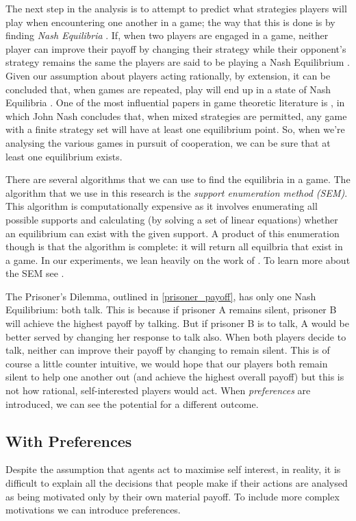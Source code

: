 \documentclass[11pt]{book}
\newcommand*{\np}{\par\noindent\newline}
\begin{document}
\np The next step in the analysis is to attempt to predict what strategies players will play when encountering one
another in a game; the way that this is done is by finding \textit{Nash Equilibria} \citep{nash_equilibrium_1950}.
If, when two players are engaged in a game, neither player can improve their payoff by changing their strategy while their opponent's strategy remains the
same the players are said to be playing a Nash Equilibrium \citep{angner_course_2012}.
Given our assumption about players acting rationally, by extension, it can be concluded that, when games are repeated, play will end up in a state
of Nash Equilibria \citep{kalai_rational_1993}. 
One of the most influential papers in game theoretic literature is \citet{nash_equilibrium_1950}, in which John
Nash concludes that, when mixed strategies are permitted, any game with a finite strategy set will have at least one
equilibrium point. So, when we're analysing the various games in pursuit of cooperation, we can be sure that at
least one equilibrium exists.

\np There are several algorithms that we can use to find the equilibria in a game.
The algorithm that we use in this research is the \textit{support enumeration method (SEM)}.
This algorithm is computationally expensive as it involves enumerating all possible supports and calculating (by solving a set of linear equations)
whether an equilibrium can exist with the given support.
A product of this enumeration though is that the algorithm is complete: it will return all equilbria that exist in a game.
In our experiments, we lean heavily on the work of \citet{knight_nashpy_2017}.
To learn more about the SEM see \citet[~p. 103]{shoham_multiagent_2008}.

\np The Prisoner's Dilemma, outlined in \ref{prisoner_payoff}, has only one Nash Equilibrium: both talk. 
This is because if prisoner A remains silent, prisoner B will achieve the highest payoff by talking. 
But if prisoner B is to talk, A would be better served by changing her response to talk also. 
When both players decide to talk, neither can improve their payoff by changing to remain silent. 
This is of course a little counter intuitive, we would hope that our players both remain silent to help one another out (and achieve the highest overall payoff) but this is not
how rational, self-interested players would act. 
When \textit{preferences} are introduced, we can see the potential for a different outcome.

\subsection{With Preferences}\label{with_preferences}
Despite the assumption that agents act to maximise self interest, in reality,
it is difficult to explain all the decisions that people make if their actions are analysed as being motivated only by their own material payoff. 
To include more complex motivations we can introduce preferences. 
\end{document}
